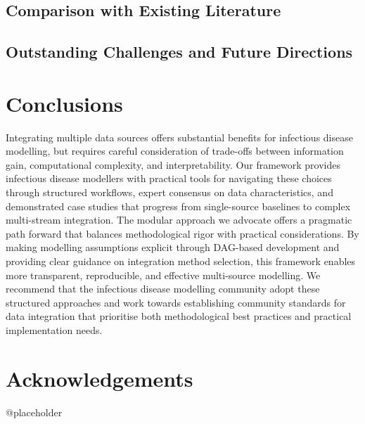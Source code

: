 \documentclass{article}
\begin{document}
\subsection{Comparison with Existing Literature}

\subsection{Outstanding Challenges and Future Directions}

\section{Conclusions}

Integrating multiple data sources offers substantial benefits for infectious disease modelling, but requires careful consideration of trade-offs between information gain, computational complexity, and interpretability.
Our framework provides infectious disease modellers with practical tools for navigating these choices through structured workflows, expert consensus on data characteristics, and demonstrated case studies that progress from single-source baselines to complex multi-stream integration.
The modular approach we advocate offers a pragmatic path forward that balances methodological rigor with practical considerations.
By making modelling assumptions explicit through DAG-based development and providing clear guidance on integration method selection, this framework enables more transparent, reproducible, and effective multi-source modelling.
We recommend that the infectious disease modelling community adopt these structured approaches and work towards establishing community standards for data integration that prioritise both methodological best practices and practical implementation needs.

\section{Acknowledgements}
@placeholder



\end{document}
